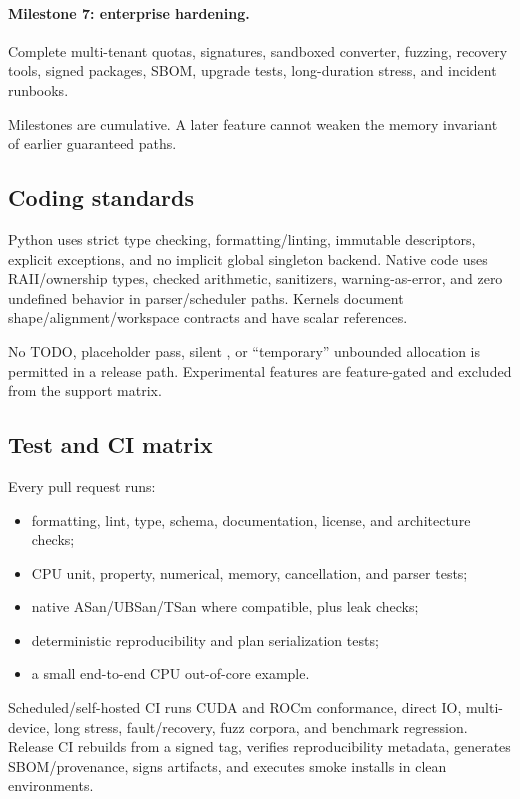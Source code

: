 \paragraph{Milestone 7: enterprise hardening.}
Complete multi-tenant quotas, signatures, sandboxed converter, fuzzing, recovery tools, signed packages, SBOM, upgrade tests, long-duration stress, and incident runbooks.

Milestones are cumulative. A later feature cannot weaken the memory invariant of earlier guaranteed paths.

\subsection{Coding standards}

Python uses strict type checking, formatting/linting, immutable descriptors, explicit exceptions, and no implicit global singleton backend. Native code uses RAII/ownership types, checked arithmetic, sanitizers, warning-as-error, and zero undefined behavior in parser/scheduler paths. Kernels document shape/alignment/workspace contracts and have scalar references.

No TODO, placeholder pass, silent , or ``temporary'' unbounded allocation is permitted in a release path. Experimental features are feature-gated and excluded from the support matrix.

\subsection{Test and CI matrix}

Every pull request runs:

\begin{itemize}
  \item formatting, lint, type, schema, documentation, license, and architecture checks;
  \item CPU unit, property, numerical, memory, cancellation, and parser tests;
  \item native ASan/UBSan/TSan where compatible, plus leak checks;
  \item deterministic reproducibility and plan serialization tests;
  \item a small end-to-end CPU out-of-core example.
\end{itemize}

Scheduled/self-hosted CI runs CUDA and ROCm conformance, direct IO, multi-device, long stress, fault/recovery, fuzz corpora, and benchmark regression. Release CI rebuilds from a signed tag, verifies reproducibility metadata, generates SBOM/provenance, signs artifacts, and executes smoke installs in clean environments.

